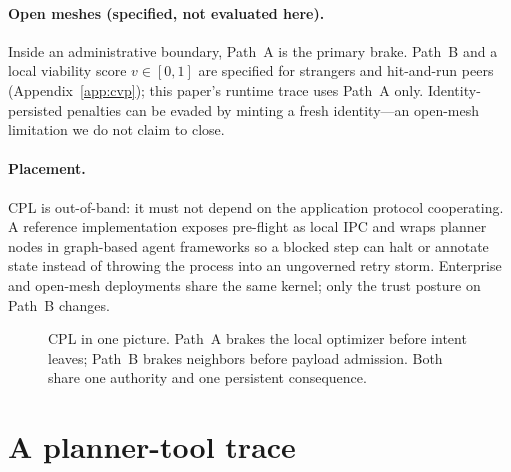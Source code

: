 \documentclass{article}
\begin{document}
\paragraph{Open meshes (specified, not evaluated here).}
Inside an administrative boundary, Path~A is the primary brake.
Path~B and a local viability score $v\in[0,1]$ are specified for strangers and hit-and-run peers (Appendix~\ref{app:cvp}); this paper's runtime trace uses Path~A only.
Identity-persisted penalties can be evaded by minting a fresh identity---an open-mesh limitation we do not claim to close.

\paragraph{Placement.}
CPL is out-of-band: it must not depend on the application protocol cooperating.
A reference implementation exposes pre-flight as local IPC and wraps planner nodes in graph-based agent frameworks so a blocked step can halt or annotate state instead of throwing the process into an ungoverned retry storm.
Enterprise and open-mesh deployments share the same kernel; only the trust posture on Path~B changes.

\begin{figure}[t]
\centering
{}
\caption{CPL in one picture. Path~A brakes the local optimizer before intent leaves; Path~B brakes neighbors before payload admission. Both share one authority and one persistent consequence.}
\label{fig:arch}
\end{figure}

\section{A planner-tool trace}
\label{sec:exp}
\end{document}
